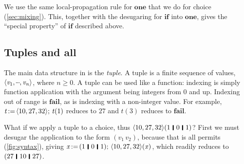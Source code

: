\documentclass[acmsmall]{acmart}
\newcommand{\Varid}[1]{\mathit{#1}}
\renewcommand{\geq}{\geqslant}
\begin{document}
We use the same local-propagation rule for \ensuremath{\textbf{one}} that we do for choice (\cref{sec:mixing}).
This, together with the desugaring for \ensuremath{\textbf{if}} into \ensuremath{\textbf{one}}, gives the ``special property'' of \ensuremath{\textbf{if}} described above.

\subsection{Tuples and \texorpdfstring{\ensuremath{\textbf{all}}}{``all''}} \label{sec:tuple}

The main data structure in \versecalc{} is the \emph{tuple}.
A tuple is a finite sequence of values, \ensuremath{\langle{}\Varid{v}_{\mathrm{1}},\mydots,\Varid{v}_{\Varid{n}}\rangle}, where $n\geq 0$.
A tuple can be used like a function: indexing is simply function application
with the argument being integers from 0 and up.  Indexing out of range is \ensuremath{\textbf{fail}}, as is indexing with
a non-integer value.
For example, \ensuremath{\Varid{t}\hspace{-0.14em}:=\hspace{-0.14em}\langle{}\mathrm{10},\mathrm{27},\mathrm{32}\rangle;\,\Varid{t}(\mathrm{1})} reduces to \ensuremath{\mathrm{27}} and \ensuremath{\Varid{t}(\mathrm{3})} reduces to \ensuremath{\textbf{fail}}.

What if we apply a tuple to a choice, thus \ensuremath{\langle{}\mathrm{10},\mathrm{27},\mathrm{32}\rangle(\mathrm{1}\hspace{0.2em}\mathop{\rule[-0.1em]{0.15em}{0.75em}}\hspace{0.2em}\mathrm{0}\hspace{0.2em}\mathop{\rule[-0.1em]{0.15em}{0.75em}}\hspace{0.2em}\mathrm{1})}?  First we must
desugar the application to the form \ensuremath{(\Varid{v}_{\mathrm{1}}\,\Varid{v}_{\mathrm{2}})}, because that is all \versecalc{} permits (\cref{fig:syntax}),
giving \ensuremath{\Varid{x}\hspace{-0.14em}:=\hspace{-0.14em}(\mathrm{1}\hspace{0.2em}\mathop{\rule[-0.1em]{0.15em}{0.75em}}\hspace{0.2em}\mathrm{0}\hspace{0.2em}\mathop{\rule[-0.1em]{0.15em}{0.75em}}\hspace{0.2em}\mathrm{1});\,\langle{}\mathrm{10},\mathrm{27},\mathrm{32}\rangle(\Varid{x})}, which readily reduces to \ensuremath{(\mathrm{27}\hspace{0.2em}\mathop{\rule[-0.1em]{0.15em}{0.75em}}\hspace{0.2em}\mathrm{10}\hspace{0.2em}\mathop{\rule[-0.1em]{0.15em}{0.75em}}\hspace{0.2em}\mathrm{27})}.
\end{document}
